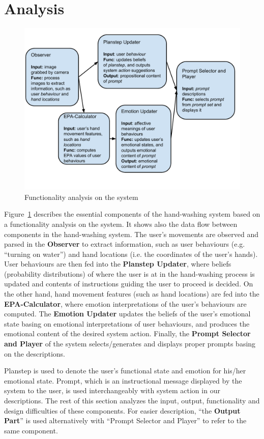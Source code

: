 \section{Analysis}

\begin{figure}[h!]
\centering
\includegraphics[width=0.9\linewidth]{fig-components.pdf}
\caption{Functionality analysis on the system}
\label{fig:components}
\end{figure}

Figure~\ref{fig:components} describes the essential components of the hand-washing system based on a functionality analysis on the system. It shows also the data flow between components in the hand-washing system. The user's movements are observed and parsed in the \textbf{Observer} to extract information, such as user behaviours (e.g. ``turning on water'') and hand locations (i.e. the coordinates of the user's hands). User behaviours are then fed into the \textbf{Planstep Updater}, where beliefs (probability distributions) of where the user is at in the hand-washing process is updated and contents of instructions guiding the user to proceed is decided. On the other hand, hand movement features (such as hand locations) are fed into the \textbf{EPA-Calculator}, where emotion interpretations of the user's behaviours are computed. The \textbf{Emotion Updater} updates the beliefs of the user's emotional state basing on emotional interpretations of user behaviours, and produces the emotional content of the desired system action. Finally, the \textbf{Prompt Selector and Player} of the system selects/generates and displays proper prompts basing on the descriptions. 

Planstep is used to denote the user's functional state and emotion for his/her emotional state. Prompt, which is an instructional message displayed by the system to the user, is used interchangeably with system action in our descriptions. The rest of this section analyzes the input, output, functionality and design difficulties of these components. For easier description, ``the \textbf{Output Part}'' is used alternatively with ``Prompt Selector and Player'' to refer to the same component.

